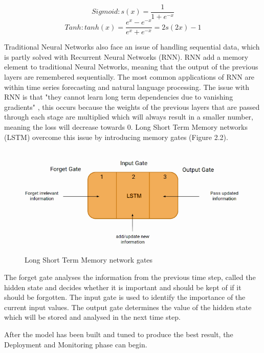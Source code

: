 \documentclass{imc-inf}
\begin{document}
	\begin{equation}
		Sigmoid: s(x) = \frac{1}{1 + e^{-x}}
	\end{equation}
	\begin{equation}
		Tanh: tanh(x) = \frac{e^{x}-e^{-x}}{e^{x}+e^{-x}} = 2s(2x) - 1
	\end{equation}
	
	
	Traditional Neural Networks also face an issue of handling sequential data, which is partly solved with Recurrent Neural Networks (RNN). RNN add a memory element to traditional Neural Networks, meaning that the output of the previous layers are remembered sequentially. The most common applications of RNN are within time series forecasting and natural language processing. The issue with RNN is that "they cannot learn long term dependencies due to vanishing gradients" \cite{website:AV_LSTM}, this occurs because the weights of the previous layers that are passed through each stage are multiplied which will always result in a smaller number, meaning the loss will decrease towards 0. Long Short Term Memory networks (LSTM) overcome this issue by introducing memory gates (Figure 2.2).
	\begin{figure}
		\caption{Long Short Term Memory network gates}
		\includegraphics[width=15cm]{media/LSTM.png}
		\cite{website:AV_LSTM}
	\end{figure}
	The forget gate analyses the information from the previous time step, called the hidden state and decides whether it is important and should be kept of if it should be forgotten.
	The input gate is used to identify the importance of the current input values.
	The output gate determines the value of the hidden state which will be stored and analysed in the next time step.
	\newline
	
	After the model has been built and tuned to produce the best result, the Deployment and Monitoring phase can begin. 
	
\end{document}
